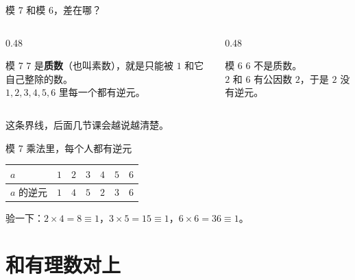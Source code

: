 \documentclass[10pt]{beamer}
\begin{document}
\begin{frame}{模 7 和模 6，差在哪？}
  \begin{columns}[T]
    \begin{column}{0.48\textwidth}
      \begin{block}{模 7}
        \(7\) 是\textbf{质数}（也叫素数），就是只能被 \(1\) 和它自己整除的数。\\
        \(1,2,3,4,5,6\) 里每一个都有逆元。
      \end{block}
    \end{column}
    \begin{column}{0.48\textwidth}
      \begin{block}{模 6}
        \(6\) 不是质数。\\
        \(2\) 和 \(6\) 有公因数 \(2\)，于是 \(2\) 没有逆元。
      \end{block}
    \end{column}
  \end{columns}
  \pause
  \begin{center}
    {\large 这条界线，后面几节课会越说越清楚。}
  \end{center}
\end{frame}

\begin{frame}{模 7 乘法里，每个人都有逆元}
  \begin{center}
  \begin{tabular}{@{}lcccccc@{}}
    \toprule
    \(a\) & \(1\) & \(2\) & \(3\) & \(4\) & \(5\) & \(6\) \\
    \midrule
    \(a\) 的逆元 & \(1\) & \(4\) & \(5\) & \(2\) & \(3\) & \(6\) \\
    \bottomrule
  \end{tabular}
  \end{center}
  \pause
  \begin{center}
    验一下：\(2\times4=8\equiv1\)，\(3\times5=15\equiv1\)，\(6\times6=36\equiv1\)。
  \end{center}
\end{frame}

\section{和有理数对上}
\end{document}
